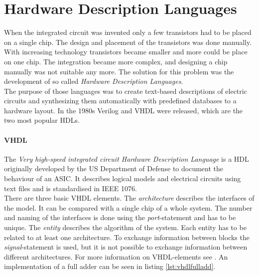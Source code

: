 \chapter{Hardware Description Languages}
\label{kap:HDL}
When the integrated circuit was invented only a few transistors had to be placed on a single chip. The design and placement of the transistors was done manually. With increasing technology transistors became smaller and more could be place on one chip. The integration became more complex, and designing a chip manually was not suitable any more. The solution for this problem was the development of so called \textit{Hardware Description Languages}.\\
The purpose of those languages was to create text-based descriptions of electric circuits and synthesizing them automatically with predefined databases to a hardware layout. In the 1980s Verilog and VHDL were released, which are the two most popular HDLs.
\subsubsection{VHDL}
The \textit{Very high-speed integrated circuit Hardware Description Language} is a HDL originally developed by the US Department of Defense to document the behaviour of an ASIC. It describes logical models and electrical circuits using text files and is standardised in IEEE 1076.\\
There are three basic VHDL elements. The \textit{architecture} describes the interfaces of the model. It can be compared with a single chip of a whole system. The number and naming of the interfaces is done using the \textit{port}-statement and has to be unique. The \textit{entity} describes the algorithm of the system. Each entity has to be related to at least one architecture. To exchange information between blocks the \textit{signal}-statement is used, but it is not possible to exchange information between different architectures. For more information on VHDL-elements see \cite{JuergenReichardt2013}. An implementation of a full adder can be seen in listing \ref{lst:vhdlfulladd}.

\lstset{language=VHDL, tabsize=4}
\begin{center}
\end{center}


